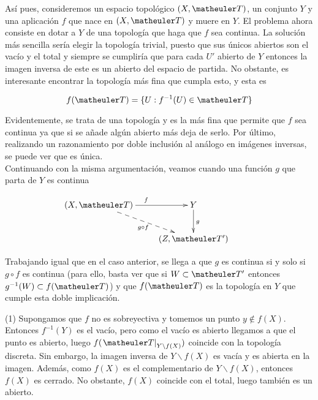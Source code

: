 Así pues, consideremos un espacio topológico $(X,\T)$, un conjunto $Y$ y una aplicación $f$ que nace en $(X,\T)$ y muere en $Y$. El problema ahora consiste en dotar a $Y$ de una topología que haga que $f$ sea continua. La solución más sencilla sería elegir la topología trivial, puesto que sus únicos abiertos son el vacío y el total y siempre se cumpliría que para cada $U'$ abierto de $Y$ entonces la imagen inversa de este es un abierto del espacio de partida. No obstante, es interesante encontrar la topología más fina que cumpla esto, y esta es 

\[f(\T)=\{U: f^{-1}(U)\in \T\}\]

Evidentemente, se trata de una topología y es la más fina que permite que $f$ sea continua ya que si se añade algún abierto más deja de serlo. Por último, realizando un razonamiento por doble inclusión al análogo en imágenes inversas, se puede ver que es única. \\

Continuando con la misma argumentación, veamos cuando una función $g$ que parta de $Y$ es continua

\begin{equation*}
\xymatrix{
(X,\T) \ar[r]^f \ar@{-->}[rd]_{g\circ f} &
Y \ar[d]^g & \\
&(Z,\T')}
\end{equation*}

Trabajando igual que en el caso anterior, se llega a que $g$ es continua si y solo si $g\circ f$ es continua (para ello, basta ver que si $W\subset \T'$ entonces $g^{-1}(W)\subset f(\T)$) y que $f(\T)$ es la topología en $Y$ que cumple esta doble implicación. \\

\begin{obs}[Sobreyectividad]

(1) Supongamos que $f$ no es sobreyectiva y tomemos un punto $y\notin f(X)$. Entonces $f^{-1}(Y)$ es el vacío, pero como el vacío es abierto llegamos a que el punto es abierto, luego $f(\left.\T\right|_{Y\backslash f(X)})$ coincide con la topología discreta. Sin embargo, la imagen inversa de $Y\backslash f(X)$ es vacía y es abierta en la imagen. Además, como $f(X)$ es el complementario de $Y\backslash f(X)$, entonces $f(X)$ es cerrado. No obstante, $f(X)$ coincide con el total, luego también es un abierto. 

\end{obs}